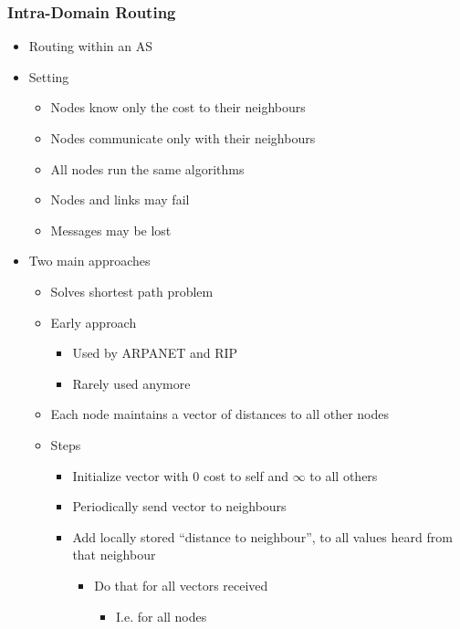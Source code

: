 \subsubsection{Intra-Domain Routing}
\begin{itemize}
    \item Routing within an AS
    \item Setting
        \begin{itemize}
            \item Nodes know only the cost to their neighbours
            \item Nodes communicate only with their neighbours
            \item All nodes run the same algorithms
            \item Nodes and links may fail
            \item Messages may be lost
        \end{itemize}
    \item Two main approaches
        \begin{itemize}
            \item Solves shortest path problem
            \item Early approach
                \begin{itemize}
                    \item Used by ARPANET and RIP
                    \item Rarely used anymore
                \end{itemize}
            \item Each node maintains a vector of distances to all other nodes
            \item Steps
                \begin{itemize}
                    \item Initialize vector with $0$ cost to self and $\infty$ to all others
                    \item Periodically send vector to neighbours
                    \item Add locally stored ``distance to neighbour'', to all values heard from that neighbour
                        \begin{itemize}
                            \item Do that for all vectors received
                                \begin{itemize}
                                    \item I.e. for all nodes

\end{itemize}
\end{itemize}
\end{itemize}
\end{itemize}
\end{itemize}
